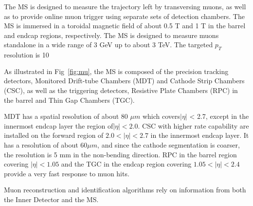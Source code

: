\par The MS is designed to measure the trajectory left by transversing muons, as well as to provide online muon trigger using separate sets of detection chambers. The MS is immersed in a toroidal magnetic field of about 0.5 T and 1 T in the barrel and endcap regions, respectively. The MS is designed to measure muons standalone in a wide range of 3 GeV up to about 3 TeV. The targeted $p_T$ resolution is 10%
\par As illustrated in Fig~\ref{fig:mu}, the MS is composed of the precision tracking detectors, Monitored Drift-tube Chambers (MDT) and Cathode Strip Chambers (CSC), as well as the triggering detectors, Resistive Plate Chambers (RPC) in the barrel and Thin Gap Chambers (TGC).
\par MDT has a spatial resolution of about 80 $\mu m$ which covers$|\eta|$ < 2.7, except in the innermost endcap layer the region of$|\eta| < 2.0$. CSC with higher rate capability are installed on the forward region of $2.0 < |\eta| < 2.7$ in the innermost endcap layer. It has a resolution of about 60$\mu m$, and since the cathode segmentation is coarser, the resolution is 5 mm in the non-bending direction.	RPC in the barrel region covering $ |\eta| < 1.05$ and the TGC in the endcap region covering $1.05 < |\eta| < 2.4$ provide a very fast response to muon hits.
\par Muon reconstruction and identification algorithms rely on information from both the Inner Detector and the MS.

